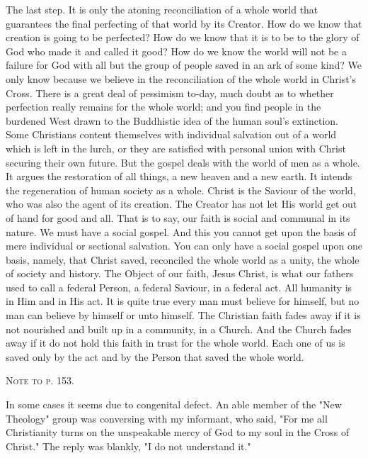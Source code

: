 \documentclass[12pt,a5paper,twoside,titlepage]{book}
\begin{document}
The last step. It is only the atoning reconciliation 
of a whole world that guarantees the 
final perfecting of that world by its Creator. 
How do we know that creation is going to 
be perfected? How do we know that it is 
to be to the glory of God who made it and 
called it good? How do we know the world 
will not be a failure for God with all but the 
group of people saved in an ark of some kind? 
We only know because we believe in the 
reconciliation of the whole world in Christ's 
Cross. There is a great deal of pessimism 
to-day, much doubt as to whether perfection 
really remains for the whole world; and you 
find people in the burdened West drawn to 
the Buddhistic idea of the human soul's extinction. 
Some Christians content themselves 
with individual salvation out of a world which 
is left in the lurch, or they are satisfied with 
personal union with Christ securing their 
own future. But the gospel deals with the 
world of men as a whole. It argues the restoration 
of all things, a new heaven and a 
new earth. It intends the regeneration of 
human society as a whole. Christ is the 
Saviour of the world, who was also the agent 
of its creation. The Creator has not let His 
world get out of hand for good and all. That 
is to say, our faith is social and communal in 
its nature. We must have a social gospel. And 
this you cannot get upon the basis of mere 
individual or sectional salvation. You can only 
have a social gospel upon one basis, namely, that 
Christ saved, reconciled the whole world as a 
unity, the whole of society and history. The 
Object of our faith, Jesus Christ, is what our 
fathers used to call a federal Person, a federal 
Saviour, in a federal act. All humanity is in 
Him and in His act. It is quite true every 
man must believe for himself, but no man 
can believe by himself or unto himself. The 
Christian faith fades away if it is not nourished 
and built up in a community, in a Church. 
And the Church fades away if it do not hold 
this faith in trust for the whole world. Each 
one of us is saved only by the act and by the 
Person that saved the whole world. 

\begin{center}
\textsc{Note to p. 153.} 
\end{center}

In some cases it seems due to congenital defect. An 
able member of the "New Theology" group was conversing 
with my informant, who said, "For me all 
Christianity turns on the unspeakable mercy of God to my 
soul in the Cross of Christ." The reply was blankly, "I 
do not understand it." 
\end{document}
